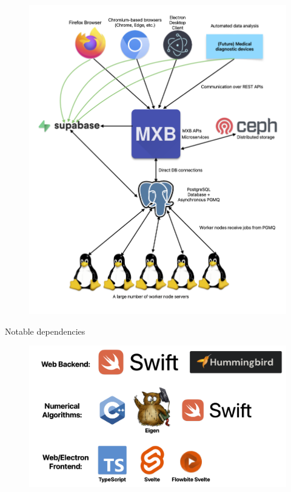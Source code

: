\documentclass{beamer}
\begin{document}
\begin{frame}
    \begin{figure}
        \includegraphics[height=\textheight]{assets/architecture.png}
    \end{figure}
\end{frame}

\begin{frame}{Notable dependencies}
    \begin{figure}
        \includegraphics[width=\linewidth]{assets/dependencies.png}
    \end{figure}
\end{frame}
\end{document}
